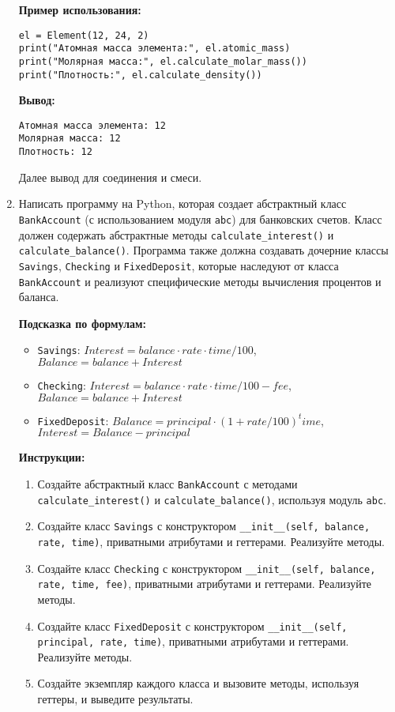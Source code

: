 \begin{enumerate}
\textbf{Пример использования:}
\begin{verbatim}
el = Element(12, 24, 2)
print("Атомная масса элемента:", el.atomic_mass)
print("Молярная масса:", el.calculate_molar_mass())
print("Плотность:", el.calculate_density())
\end{verbatim}

\textbf{Вывод:}
\begin{verbatim}
Атомная масса элемента: 12
Молярная масса: 12
Плотность: 12
\end{verbatim}

Далее вывод для соединения и смеси.

\item
Написать программу на Python, которая создает абстрактный класс \texttt{BankAccount} (с использованием модуля \texttt{abc}) для банковских счетов. 
Класс должен содержать абстрактные методы \texttt{calculate\_interest()} и \texttt{calculate\_balance()}. 
Программа также должна создавать дочерние классы \texttt{Savings}, \texttt{Checking} и \texttt{FixedDeposit}, 
которые наследуют от класса \texttt{BankAccount} и реализуют специфические методы вычисления процентов и баланса.

\textbf{Подсказка по формулам:}
\begin{itemize}
    \item \texttt{Savings}: $Interest = balance \cdot rate \cdot time / 100$, $Balance = balance + Interest$
    \item \texttt{Checking}: $Interest = balance \cdot rate \cdot time / 100 - fee$, $Balance = balance + Interest$
    \item \texttt{FixedDeposit}: $Balance = principal \cdot (1 + rate/100)^time$, $Interest = Balance - principal$
\end{itemize}

\textbf{Инструкции:}
\begin{enumerate}
    \item Создайте абстрактный класс \texttt{BankAccount} с методами \texttt{calculate\_interest()} и \texttt{calculate\_balance()}, используя модуль \texttt{abc}.
    \item Создайте класс \texttt{Savings} с конструктором \texttt{\_\_init\_\_(self, balance, rate, time)}, приватными атрибутами и геттерами. Реализуйте методы.
    \item Создайте класс \texttt{Checking} с конструктором \texttt{\_\_init\_\_(self, balance, rate, time, fee)}, приватными атрибутами и геттерами. Реализуйте методы.
    \item Создайте класс \texttt{FixedDeposit} с конструктором \texttt{\_\_init\_\_(self, principal, rate, time)}, приватными атрибутами и геттерами. Реализуйте методы.
    \item Создайте экземпляр каждого класса и вызовите методы, используя геттеры, и выведите результаты.
\end{enumerate}


\end{enumerate}
